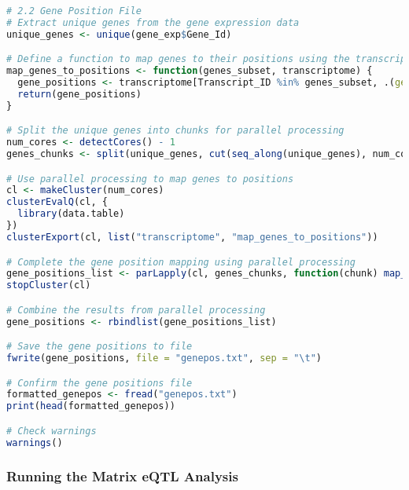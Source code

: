 \documentclass[12pt,a4paper]{article}
\begin{document}
\begin{lstlisting}[language=R]
# 2.2 Gene Position File
# Extract unique genes from the gene expression data
unique_genes <- unique(gene_exp$Gene_Id)

# Define a function to map genes to their positions using the transcriptome data
map_genes_to_positions <- function(genes_subset, transcriptome) {
  gene_positions <- transcriptome[Transcript_ID %in% genes_subset, .(geneid = Transcript_ID, chr = CHROM, s1 = POS, s2 = POS + Length)]
  return(gene_positions)
}

# Split the unique genes into chunks for parallel processing
num_cores <- detectCores() - 1
genes_chunks <- split(unique_genes, cut(seq_along(unique_genes), num_cores, labels = FALSE))

# Use parallel processing to map genes to positions
cl <- makeCluster(num_cores)
clusterEvalQ(cl, {
  library(data.table)
})
clusterExport(cl, list("transcriptome", "map_genes_to_positions"))

# Complete the gene position mapping using parallel processing
gene_positions_list <- parLapply(cl, genes_chunks, function(chunk) map_genes_to_positions(chunk, transcriptome))
stopCluster(cl)

# Combine the results from parallel processing
gene_positions <- rbindlist(gene_positions_list)

# Save the gene positions to file
fwrite(gene_positions, file = "genepos.txt", sep = "\t")

# Confirm the gene positions file
formatted_genepos <- fread("genepos.txt")
print(head(formatted_genepos))

# Check warnings
warnings()
\end{lstlisting}

\subsubsection{Running the Matrix eQTL Analysis}
\end{document}
